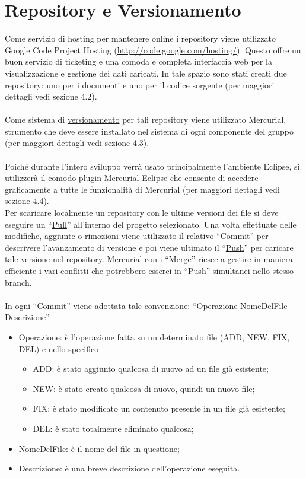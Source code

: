 \chapter{Repository e Versionamento}
\thispagestyle{fancy}
Come servizio di hosting per mantenere online i repository
viene utilizzato Google Code Project Hosting
(\url{http://code.google.com/hosting/}). Questo offre un buon
servizio di ticketing e una comoda e completa interfaccia web per
la visualizzazione e gestione dei dati caricati. In tale spazio sono
stati creati due repository: uno per i documenti e uno per il codice sorgente
(per maggiori dettagli vedi sezione 4.2). 
\\ \\
Come sistema di
\underline{versionamento} per tali repository viene utilizzato Mercurial,
strumento che deve essere installato nel sistema di ogni componente del gruppo
(per maggiori dettagli vedi sezione 4.3).
\\ \\
Poich\'e durante l'intero sviluppo verr\`a usato principalmente l'ambiente
Eclipse, si utilizzer\`a il comodo plugin Mercurial Eclipse che consente di accedere
graficamente a tutte le funzionalit\`a di Mercurial (per maggiori dettagli vedi
sezione 4.4). 
\\
Per scaricare localmente un repository con le ultime versioni dei
file si deve eseguire un ``\underline{Pull}'' all'interno del progetto
selezionato. Una volta effettuate delle modifiche, aggiunte o rimozioni viene
utilizzato il relativo ``\underline{Commit}'' per descrivere l'avanzamento di
versione e poi viene ultimato il ``\underline{Push}'' per caricare tale versione
nel repository. Mercurial con i ``\underline{Merge}'' riesce a gestire in maniera efficiente i vari conflitti
che potrebbero esserci in ``Push'' simultanei nello stesso branch.\\ 
\\
In ogni ``Commit'' viene adottata tale convenzione: 
``Operazione NomeDelFile Descrizione''
\begin{itemize}
\item {Operazione: \`e l'operazione fatta su un determinato file (ADD, NEW, FIX,
DEL) e nello specifico}
\begin {itemize}
\item {ADD: \`e stato aggiunto qualcosa di nuovo ad un file gi\`a esistente;}
\item {NEW: \`e stato creato qualcosa di nuovo, quindi un nuovo file;} 
\item {FIX: \`e stato modificato un contenuto presente in un file gi\`a
esistente;} 
\item {DEL: \`e stato totalmente eliminato qualcosa;}
\end {itemize}
\item {NomeDelFile: \`e il nome del file in questione;}
\item {Descrizione: \`e una breve descrizione dell'operazione eseguita.}
\end{itemize}
